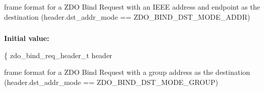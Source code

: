 frame format for a Z\-D\-O Bind Request with an I\-E\-E\-E address and endpoint as the destination (header.\-dst\-\_\-addr\-\_\-mode == Z\-D\-O\-\_\-\-B\-I\-N\-D\-\_\-\-D\-S\-T\-\_\-\-M\-O\-D\-E\-\_\-\-A\-D\-D\-R) 

\hypertarget{group__zdo_ga41ab3318ee2bd538e044d6d6e101f376}{
\subsubsection[{zdo\-\_\-bind\-\_\-group\-\_\-req\-\_\-t}]{}}\label{group__zdo_ga41ab3318ee2bd538e044d6d6e101f376}
{\bfseries Initial value\-:}
\begin{DoxyCode}
\{
   zdo\_bind\_req\_header\_t   header
\end{DoxyCode}


frame format for a Z\-D\-O Bind Request with a group address as the destination (header.\-dst\-\_\-addr\-\_\-mode == Z\-D\-O\-\_\-\-B\-I\-N\-D\-\_\-\-D\-S\-T\-\_\-\-M\-O\-D\-E\-\_\-\-G\-R\-O\-U\-P) 

